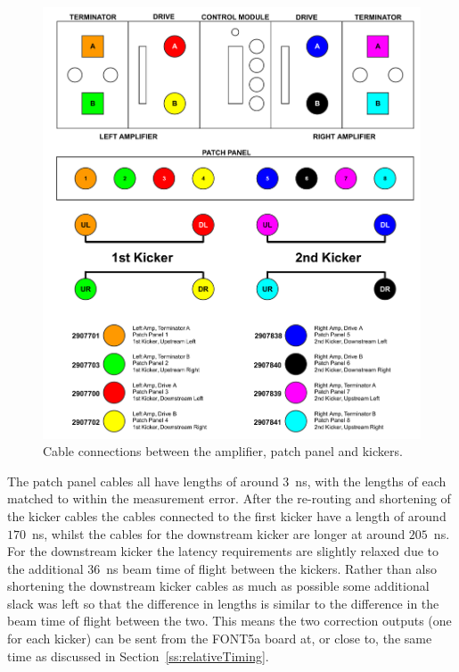 \begin{figure}
  \centering
  \includegraphics[width=\textwidth]{Figures/commissioning/kickerCables}
  \caption{Cable connections between the amplifier, patch panel and kickers.}
  \label{f:kickerCables}
\end{figure}

The patch panel cables all have lengths of around 3~ns, with the lengths of each matched to within the measurement error. After the re-routing and shortening of the kicker cables the cables connected to the first kicker have a length of around \(170\)~ns, whilst the cables for the downstream kicker are longer at around \(205\)~ns. For the downstream kicker the latency requirements are slightly relaxed due to the additional 36~ns beam time of flight between the kickers. Rather than also shortening the downstream kicker cables as much as possible some additional slack was left so that the difference in lengths is similar to the difference in the beam time of flight between the two. This means the two correction outputs (one for each kicker) can be sent from the FONT5a board at, or close to, the same time as discussed in Section~\ref{ss:relativeTiming}.


